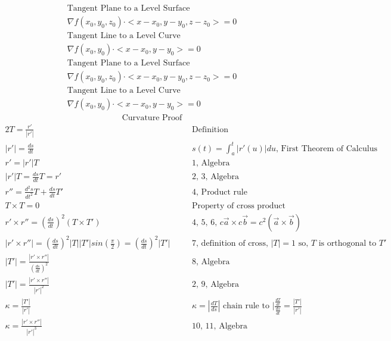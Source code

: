 \documentclass{article}
\begin{document}
\begin{gather*}
    \text{Tangent Plane to a Level Surface}
    \\
    \nabla f(x_0,y_0,z_0)\cdot<x-x_0,y-y_0,z-z_0>=0
    \\
    \text{Tangent Line to a Level Curve}
    \\
    \nabla f(x_0,y_0)\cdot<x-x_0,y-y_0>=0
\end{gather*}
\begin{gather*}
 	   \text{Tangent Plane to a Level Surface}
	    \\
 	   \nabla f(x_0,y_0,z_0)\cdot<x-x_0,y-y_0,z-z_0>=0
 	   \\
 	   \text{Tangent Line to a Level Curve}
	    \\
	    \nabla f(x_0,y_0)\cdot<x-x_0,y-y_0>=0
\end{gather*}
\begin{gather*}
    \text{Curvature Proof}
\end{gather*}
\begin{alignat}{2}
    T=\frac{r'}{|r'|}                           &\quad &\text{Definition}
    \\
    |r'|=\frac{ds}{dt}                          &\quad &s(t)=\int_a^t|r'(u)|du\text{, First Theorem of Calculus}
    \\
    r'=|r'|T                                    &\quad &\text{1, Algebra}
    \\
    |r'|T=\frac{ds}{dt}T=r'                     &\quad &\text{2, 3, Algebra}
    \\
    r''=\frac{d^2s}{dt^2}T+\frac{ds}{dt}T'      &\quad &\text{4, Product rule}
    \\
    T\times T=0                                 &\quad &\text{Property of cross product}
    \\
    r'\times r''=(\frac{ds}{dt})^2(T\times T')  &\quad &\text{4, 5, 6, } c\Vec{a}\times c\Vec{b}=c^2(\Vec{a}\times \Vec{b})
    \\
    |r'\times r''|=(\frac{ds}{dt})^2|T||T'|sin(\frac{\pi}{2})=(\frac{ds}{dt})^2|T'| &\quad &\text{7, definition of cross, } |T|=1\text{ so, } T\text{ is orthogonal to }T'
    \\
    |T'|=\frac{|r'\times r''|}{(\frac{ds}{dt})^2} &\quad &\text{8, Algebra}
    \\
    |T'|=\frac{|r'\times r''|}{|r'|^2}         &\quad &\text{2, 9, Algebra}
    \\
    \kappa=\frac{|T'|}{|r'|}                    &\quad &\kappa=|\frac{dT}{ds}|\text{ chain rule to }|\frac{\frac{dT}{dt}}{\frac{ds}{dt}}=\frac{|T'|}{|r'|}
    \\
    \kappa=\frac{|r'\times r''|}{|r'|^3}        &\quad &\text{10, 11, Algebra}
\end{alignat}
\end{document}
